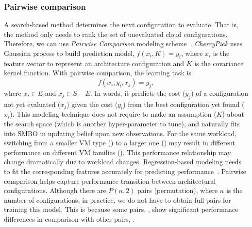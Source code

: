 \subsubsection*{Pairwise comparison}
A search-based method determines the next configuration to evaluate.
That is, the method only needs to rank
the set of unevaluated cloud configurations.
Therefore, we can use \textit{Pairwise Comparison} modeling scheme~\cite{wauthier2013efficient}.
\emph{CherryPick} uses Gaussian process to build prediction model,
$f(x_i, K) = y_i$, where $x_i$ is the feature vector to represent
an architecture configuration and $K$ is the covariance kernel function.
With pairwise comparison, the learning task is
\begin{equation} \label{eq:1}
f(x_i, y_i, x_j) = y_j,
\end{equation}
where $x_i \in E$ and $x_j \in S-E$.
In words, it predicts the cost ($y_j$) of a configuration not yet
evaluated ($x_j$) given the cost ($y_i$) from the best configuration
yet found ($x_i$).
This modeling technique does not require to make an assumption ($K$) about
the search space (which is another hyper-parameter to tune),
and
naturally fits into SMBO in updating belief upon new observations.
For the same workload, switching
from a smaller VM type () to a larger one ()
may result in different performance on different VM families
().
This performance relationship may change dramatically due to workload changes.
Regression-based modeling needs to fit the corresponding features accurately
for predicting performance~\cite{rasmussen2004gaussian,wettschereck1997review}.
Pairwise comparison helps capture performance transition
between architectural configurations.
Although there are $P(n,2)$ pairs (permutation),
where $n$ is the number of configurations,
in practice, we do not have to obtain full pairs for training this model.
This is because some pairs, , show
significant performance differences in comparison with other pairs,
.

